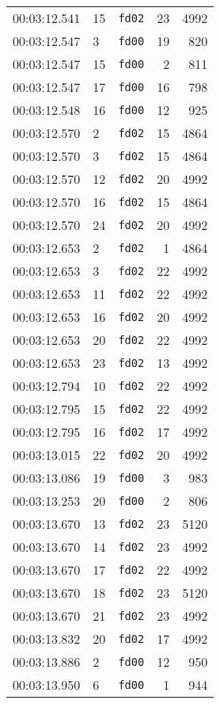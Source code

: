 \documentclass{article}
\begin{document}
\begin{longtable}{lllrr}
00:03:12.541 & 15 & \texttt{fd02} & 23 & 4992 \\
00:03:12.547 & 3 & \texttt{fd00} & 19 & 820 \\
00:03:12.547 & 15 & \texttt{fd00} & 2 & 811 \\
00:03:12.547 & 17 & \texttt{fd00} & 16 & 798 \\
00:03:12.548 & 16 & \texttt{fd00} & 12 & 925 \\
00:03:12.570 & 2 & \texttt{fd02} & 15 & 4864 \\
00:03:12.570 & 3 & \texttt{fd02} & 15 & 4864 \\
00:03:12.570 & 12 & \texttt{fd02} & 20 & 4992 \\
00:03:12.570 & 16 & \texttt{fd02} & 15 & 4864 \\
00:03:12.570 & 24 & \texttt{fd02} & 20 & 4992 \\
00:03:12.653 & 2 & \texttt{fd02} & 1 & 4864 \\
00:03:12.653 & 3 & \texttt{fd02} & 22 & 4992 \\
00:03:12.653 & 11 & \texttt{fd02} & 22 & 4992 \\
00:03:12.653 & 16 & \texttt{fd02} & 20 & 4992 \\
00:03:12.653 & 20 & \texttt{fd02} & 22 & 4992 \\
00:03:12.653 & 23 & \texttt{fd02} & 13 & 4992 \\
00:03:12.794 & 10 & \texttt{fd02} & 22 & 4992 \\
00:03:12.795 & 15 & \texttt{fd02} & 22 & 4992 \\
00:03:12.795 & 16 & \texttt{fd02} & 17 & 4992 \\
00:03:13.015 & 22 & \texttt{fd02} & 20 & 4992 \\
00:03:13.086 & 19 & \texttt{fd00} & 3 & 983 \\
00:03:13.253 & 20 & \texttt{fd00} & 2 & 806 \\
00:03:13.670 & 13 & \texttt{fd02} & 23 & 5120 \\
00:03:13.670 & 14 & \texttt{fd02} & 23 & 4992 \\
00:03:13.670 & 17 & \texttt{fd02} & 22 & 4992 \\
00:03:13.670 & 18 & \texttt{fd02} & 23 & 5120 \\
00:03:13.670 & 21 & \texttt{fd02} & 23 & 4992 \\
00:03:13.832 & 20 & \texttt{fd02} & 17 & 4992 \\
00:03:13.886 & 2 & \texttt{fd00} & 12 & 950 \\
00:03:13.950 & 6 & \texttt{fd00} & 1 & 944 \\

\end{longtable}
\end{document}

